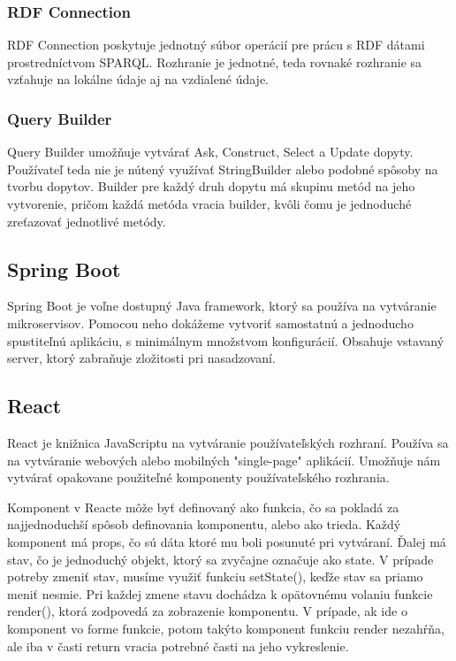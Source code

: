 \subsubsection{RDF Connection}
RDF Connection poskytuje jednotný súbor operácií pre prácu s RDF dátami prostredníctvom SPARQL. Rozhranie je jednotné, teda rovnaké rozhranie sa vzťahuje na lokálne údaje aj na vzdialené údaje.

\subsubsection{Query Builder}
Query Builder umožňuje vytvárať Ask, Construct, Select a Update dopyty.  Používateľ teda nie je nútený využívať StringBuilder alebo podobné spôsoby na tvorbu dopytov. Builder pre každý druh dopytu má skupinu metód na jeho vytvorenie, pričom každá metóda vracia builder, kvôli čomu je jednoduché zreťazovať jednotlivé metódy.


\subsection{Spring Boot} \label{secSpringBoot}
Spring Boot je voľne dostupný Java framework, ktorý sa používa na vytváranie mikroservisov. Pomocou neho dokážeme vytvoriť samostatnú a jednoducho spustiteľnú aplikáciu, s minimálnym množstvom konfigurácií. Obsahuje vstavaný server, ktorý zabraňuje zložitosti pri nasadzovaní.

\subsection{React} \label{secReact}
React je knižnica JavaScriptu na vytváranie používateľských rozhraní. Používa sa na vytváranie webových alebo mobilných "single-page" aplikácií.  Umožňuje nám vytvárať opakovane použiteľné komponenty používateľského rozhrania. 

Komponent v Reacte môže byť definovaný ako funkcia, čo sa pokladá za najjednoduchší spôsob definovania komponentu, alebo ako trieda. Každý komponent má props, čo sú dáta ktoré mu boli posunuté pri vytváraní. Ďalej má stav, čo je jednoduchý objekt, ktorý sa zvyčajne označuje ako state. V prípade potreby zmeniť stav, musíme využiť funkciu setState(), keďže stav sa priamo meniť nesmie. Pri každej zmene stavu dochádza k opätovnému volaniu funkcie render(), ktorá zodpovedá za zobrazenie komponentu. V prípade, ak ide o komponent vo forme funkcie, potom takýto komponent funkciu render nezahŕňa, ale iba v časti return vracia potrebné časti na jeho vykreslenie. 

